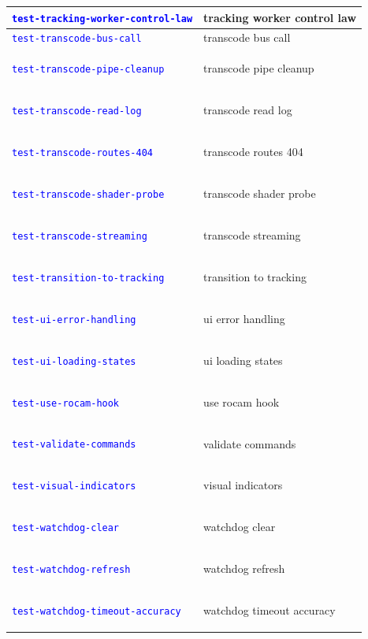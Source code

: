 \documentclass[12pt, titlepage]{article}
\newcommand{\tiddef}[1]{\hypertarget{tid:#1}{\textcolor{blue}{\texttt{#1}}}}
\begin{document}
\begin{longtable}{|>{\raggedright\arraybackslash}p{5cm}|>{\raggedright\arraybackslash}p{9cm}|}
  \tiddef{test-tracking-worker-control-law}            & tracking worker control law            \\ \hline
  \tiddef{test-transcode-bus-call}                     & transcode bus call                     \\ \hline
  \tiddef{test-transcode-pipe-cleanup}                 & transcode pipe cleanup                 \\ \hline
  \tiddef{test-transcode-read-log}                     & transcode read log                     \\ \hline
  \tiddef{test-transcode-routes-404}                   & transcode routes 404                   \\ \hline
  \tiddef{test-transcode-shader-probe}                 & transcode shader probe                 \\ \hline
  \tiddef{test-transcode-streaming}                    & transcode streaming                    \\ \hline
  \tiddef{test-transition-to-tracking}                 & transition to tracking                 \\ \hline
  \tiddef{test-ui-error-handling}                      & ui error handling                      \\ \hline
  \tiddef{test-ui-loading-states}                      & ui loading states                      \\ \hline
  \tiddef{test-use-rocam-hook}                         & use rocam hook                         \\ \hline
  \tiddef{test-validate-commands}                      & validate commands                      \\ \hline
  \tiddef{test-visual-indicators}                      & visual indicators                      \\ \hline
  \tiddef{test-watchdog-clear}                         & watchdog clear                         \\ \hline
  \tiddef{test-watchdog-refresh}                       & watchdog refresh                       \\ \hline
  \tiddef{test-watchdog-timeout-accuracy}              & watchdog timeout accuracy              \\ \hline
\end{longtable}
\normalsize

\newpage

\tableofcontents

\listoftables %
\end{document}
